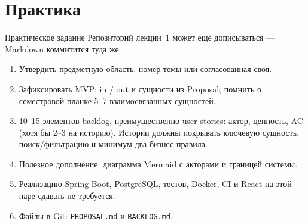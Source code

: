 \section{Практика}

\begin{frame}{Практическое задание}
  Репозиторий лекции~1 может ещё дописываться --- Markdown коммитится туда же.

  \medskip
  \footnotesize
  \begin{enumerate}\setlength\itemsep{0.22em}
    \item Утвердить предметную область: номер темы или согласованная своя.
    \item Зафиксировать MVP: in / out и сущности из Proposal;
          помнить о семестровой планке 5--7 взаимосвязанных сущностей.
    \item 10--15 элементов backlog, преимущественно user stories:
          актор, ценность, AC (хотя бы 2--3 на историю).
          Истории должны покрывать ключевую сущность,
          поиск/фильтрацию и минимум два бизнес-правила.
    \item Полезное дополнение: диаграмма Mermaid с акторами
          и границей системы.
    \item Реализацию Spring Boot, PostgreSQL, тестов, Docker, CI
          и React на этой паре сдавать не требуется.
    \item Файлы в Git: \texttt{PROPOSAL.md} и \texttt{BACKLOG.md}.
  \end{enumerate}
\end{frame}
